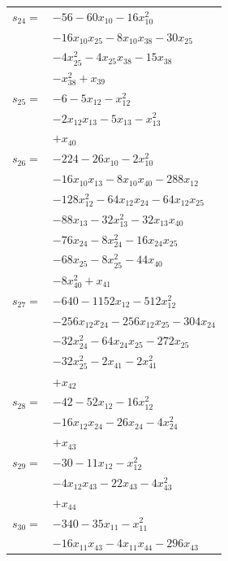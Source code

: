 \begin{longtable}{@{}r@{\;}l@{}}
\(s_{24}=\) & \(\displaystyle -56 -60x_{10} -16x_{10}^{2}\) \\
 & \(\displaystyle -16x_{10}x_{25} -8x_{10}x_{38} -30x_{25}\) \\
 & \(\displaystyle -4x_{25}^{2} -4x_{25}x_{38} -15x_{38}\) \\
 & \(\displaystyle -x_{38}^{2} +x_{39}\) \\[3pt]
\(s_{25}=\) & \(\displaystyle -6 -5x_{12} -x_{12}^{2}\) \\
 & \(\displaystyle -2x_{12}x_{13} -5x_{13} -x_{13}^{2}\) \\
 & \(\displaystyle +x_{40}\) \\[3pt]
\(s_{26}=\) & \(\displaystyle -224 -26x_{10} -2x_{10}^{2}\) \\
 & \(\displaystyle -16x_{10}x_{13} -8x_{10}x_{40} -288x_{12}\) \\
 & \(\displaystyle -128x_{12}^{2} -64x_{12}x_{24} -64x_{12}x_{25}\) \\
 & \(\displaystyle -88x_{13} -32x_{13}^{2} -32x_{13}x_{40}\) \\
 & \(\displaystyle -76x_{24} -8x_{24}^{2} -16x_{24}x_{25}\) \\
 & \(\displaystyle -68x_{25} -8x_{25}^{2} -44x_{40}\) \\
 & \(\displaystyle -8x_{40}^{2} +x_{41}\) \\[3pt]
\(s_{27}=\) & \(\displaystyle -640 -1152x_{12} -512x_{12}^{2}\) \\
 & \(\displaystyle -256x_{12}x_{24} -256x_{12}x_{25} -304x_{24}\) \\
 & \(\displaystyle -32x_{24}^{2} -64x_{24}x_{25} -272x_{25}\) \\
 & \(\displaystyle -32x_{25}^{2} -2x_{41} -2x_{41}^{2}\) \\
 & \(\displaystyle +x_{42}\) \\[3pt]
\(s_{28}=\) & \(\displaystyle -42 -52x_{12} -16x_{12}^{2}\) \\
 & \(\displaystyle -16x_{12}x_{24} -26x_{24} -4x_{24}^{2}\) \\
 & \(\displaystyle +x_{43}\) \\[3pt]
\(s_{29}=\) & \(\displaystyle -30 -11x_{12} -x_{12}^{2}\) \\
 & \(\displaystyle -4x_{12}x_{43} -22x_{43} -4x_{43}^{2}\) \\
 & \(\displaystyle +x_{44}\) \\[3pt]
\(s_{30}=\) & \(\displaystyle -340 -35x_{11} -x_{11}^{2}\) \\
 & \(\displaystyle -16x_{11}x_{43} -4x_{11}x_{44} -296x_{43}\) \\

\end{longtable}
